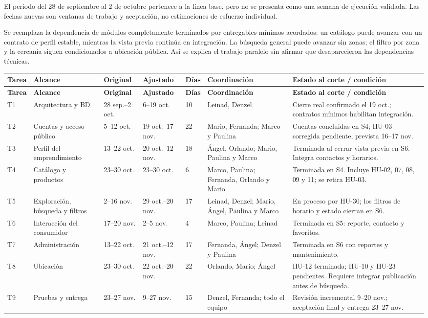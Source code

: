 El periodo del 28 de septiembre al 2 de octubre pertenece a la línea base,
pero no se presenta como una semana de ejecución validada. Las fechas nuevas
son ventanas de trabajo y aceptación, no estimaciones de esfuerzo individual.

Se reemplaza la dependencia de módulos completamente terminados por
entregables mínimos acordados: un catálogo puede avanzar con un contrato de
perfil estable, mientras la vista previa continúa en integración. La búsqueda
general puede avanzar sin zonas; el filtro por zona y la cercanía siguen
condicionados a ubicación pública. Así se explica el trabajo paralelo sin
afirmar que desaparecieron las dependencias técnicas.

\begingroup\scriptsize
\begin{longtable}{@{}L{0.9cm}L{2.4cm}L{1.8cm}L{2.0cm}L{0.7cm}L{3.3cm}L{4.5cm}@{}}
\textbf{Tarea}&\textbf{Alcance}&\textbf{Original}&
\textbf{Ajustado}&\textbf{Días}&\textbf{Coordinación}&\textbf{Estado al corte / condición}\\\midrule\endfirsthead
{}\textbf{Tarea}&\textbf{Alcance}&\textbf{Original}&
\textbf{Ajustado}&\textbf{Días}&\textbf{Coordinación}&\textbf{Estado al corte / condición}\\\midrule\endhead
\bottomrule\endfoot
T1 & Arquitectura y BD & 28 sep.--2 oct. & 6--19 oct. & 10 &
Leinad, Denzel & Cierre real confirmado el 19 oct.; contratos mínimos habilitan integración. \\
T2 & Cuentas y acceso público & 5--12 oct. & 19 oct.--17 nov. & 22 &
Mario, Fernanda; Marco y Paulina & Cuentas concluidas en S4; HU-03 corregida pendiente, prevista 16--17 nov. \\
T3 & Perfil del emprendimiento & 13--22 oct. & 20 oct.--12 nov. & 18 &
Ángel, Orlando; Mario, Paulina y Marco & Terminada al cerrar vista previa en S6. Integra contactos y horarios. \\
T4 & Catálogo y productos & 23--30 oct. & 23--30 oct. & 6 &
Marco, Paulina; Fernanda, Orlando y Mario & Terminada en S4. Incluye HU-02, 07, 08, 09 y 11; se retira HU-03. \\
T5 & Exploración, búsqueda y filtros & 2--16 nov. & 29 oct.--20 nov. & 17 &
Leinad, Denzel; Mario, Ángel, Paulina y Marco & En proceso por HU-30; los filtros de horario y estado cierran en S6. \\
T6 & Interacción del consumidor & 17--20 nov. & 2--5 nov. & 4 &
Marco, Paulina; Leinad & Terminada en S5: reporte, contacto y favoritos. \\
T7 & Administración & 13--22 oct. & 21 oct.--12 nov. & 17 &
Fernanda, Ángel; Denzel y Paulina & Terminada en S6 con reportes y mantenimiento. \\
T8 & Ubicación & 23--30 oct. & 22 oct.--20 nov. & 22 &
Orlando, Mario; Ángel & HU-12 terminada; HU-10 y HU-23 pendientes. Requiere integrar publicación antes de búsqueda. \\
T9 & Pruebas y entrega & 23--27 nov. & 9--27 nov. & 15 &
Denzel, Fernanda; todo el equipo & Revisión incremental 9--20 nov.; aceptación final y entrega 23--27 nov. \\
\end{longtable}\endgroup

